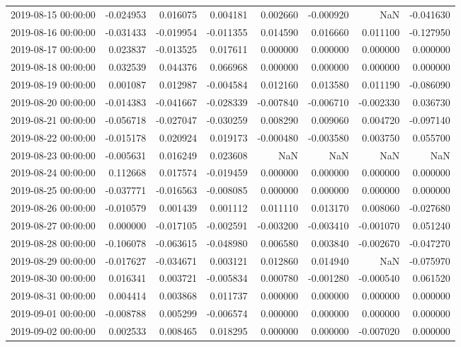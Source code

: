 \begin{tabular}{lrrrrrrr}
2019-08-15 00:00:00 & -0.024953 & 0.016075 & 0.004181 & 0.002660 & -0.000920 & NaN & -0.041630 \\
2019-08-16 00:00:00 & -0.031433 & -0.019954 & -0.011355 & 0.014590 & 0.016660 & 0.011100 & -0.127950 \\
2019-08-17 00:00:00 & 0.023837 & -0.013525 & 0.017611 & 0.000000 & 0.000000 & 0.000000 & 0.000000 \\
2019-08-18 00:00:00 & 0.032539 & 0.044376 & 0.066968 & 0.000000 & 0.000000 & 0.000000 & 0.000000 \\
2019-08-19 00:00:00 & 0.001087 & 0.012987 & -0.004584 & 0.012160 & 0.013580 & 0.011190 & -0.086090 \\
2019-08-20 00:00:00 & -0.014383 & -0.041667 & -0.028339 & -0.007840 & -0.006710 & -0.002330 & 0.036730 \\
2019-08-21 00:00:00 & -0.056718 & -0.027047 & -0.030259 & 0.008290 & 0.009060 & 0.004720 & -0.097140 \\
2019-08-22 00:00:00 & -0.015178 & 0.020924 & 0.019173 & -0.000480 & -0.003580 & 0.003750 & 0.055700 \\
2019-08-23 00:00:00 & -0.005631 & 0.016249 & 0.023608 & NaN & NaN & NaN & NaN \\
2019-08-24 00:00:00 & 0.112668 & 0.017574 & -0.019459 & 0.000000 & 0.000000 & 0.000000 & 0.000000 \\
2019-08-25 00:00:00 & -0.037771 & -0.016563 & -0.008085 & 0.000000 & 0.000000 & 0.000000 & 0.000000 \\
2019-08-26 00:00:00 & -0.010579 & 0.001439 & 0.001112 & 0.011110 & 0.013170 & 0.008060 & -0.027680 \\
2019-08-27 00:00:00 & 0.000000 & -0.017105 & -0.002591 & -0.003200 & -0.003410 & -0.001070 & 0.051240 \\
2019-08-28 00:00:00 & -0.106078 & -0.063615 & -0.048980 & 0.006580 & 0.003840 & -0.002670 & -0.047270 \\
2019-08-29 00:00:00 & -0.017627 & -0.034671 & 0.003121 & 0.012860 & 0.014940 & NaN & -0.075970 \\
2019-08-30 00:00:00 & 0.016341 & 0.003721 & -0.005834 & 0.000780 & -0.001280 & -0.000540 & 0.061520 \\
2019-08-31 00:00:00 & 0.004414 & 0.003868 & 0.011737 & 0.000000 & 0.000000 & 0.000000 & 0.000000 \\
2019-09-01 00:00:00 & -0.008788 & 0.005299 & -0.006574 & 0.000000 & 0.000000 & 0.000000 & 0.000000 \\
2019-09-02 00:00:00 & 0.002533 & 0.008465 & 0.018295 & 0.000000 & 0.000000 & -0.007020 & 0.000000 \\

\end{tabular}
